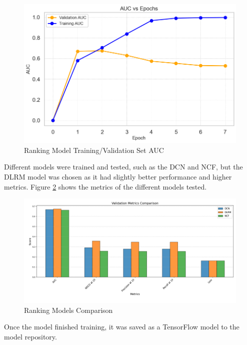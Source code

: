 \begin{figure}[H]
    \centering
    \includegraphics[width=1\textwidth]{assets/ranking_training_validation_auc.png}
    \caption{Ranking Model Training/Validation Set AUC}
    \label{fig: RankingModelTraining}
\end{figure}

Different models were trained and tested, such as the DCN and NCF, but the DLRM model was chosen as it had slightly better performance and higher metrics.
Figure \ref{fig: RankingModelsResults} shows the metrics of the different models tested.

\begin{figure}[H]
    \centering
    \includegraphics[width=\textwidth]{assets/Validation Metrics Comparison.png}
    \caption{Ranking Models Comparison}
    \label{fig: RankingModelsResults}
\end{figure}


Once the model finished training, it was saved as a TensorFlow model to the model repository.